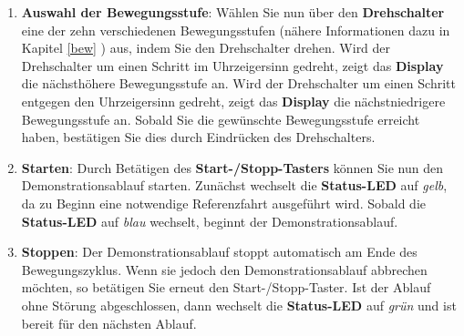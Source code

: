 \begin{enumerate}
\begin{center}
\end{center}


	
	\item \textbf{Auswahl der Bewegungsstufe}: Wählen Sie nun über den \textbf{Drehschalter} eine der zehn verschiedenen Bewegungsstufen (nähere Informationen dazu in Kapitel \ref{bew} ) aus, indem Sie den Drehschalter drehen. Wird der Drehschalter um einen Schritt im Uhrzeigersinn gedreht, zeigt das \textbf{Display} die nächsthöhere Bewegungsstufe an. Wird der Drehschalter um einen Schritt entgegen den Uhrzeigersinn gedreht, zeigt das \textbf{Display} die nächstniedrigere Bewegungsstufe an. Sobald Sie die gewünschte Bewegungsstufe erreicht haben, bestätigen Sie dies durch Eindrücken des Drehschalters.	
	
	\item \textbf{Starten}: Durch Betätigen des \textbf{Start-/Stopp-Tasters} können Sie nun den Demonstrationsablauf starten. Zunächst wechselt die \textbf{Status-LED} auf \textit{gelb}, da zu Beginn eine notwendige Referenzfahrt ausgeführt wird. Sobald die \textbf{Status-LED} auf \textit{blau} wechselt, beginnt der Demonstrationsablauf.
	
	\item \textbf{Stoppen}: Der Demonstrationsablauf stoppt automatisch am Ende des Bewegungszyklus. Wenn sie jedoch den Demonstrationsablauf abbrechen möchten, so betätigen Sie erneut den Start-/Stopp-Taster. Ist der Ablauf ohne Störung abgeschlossen, dann wechselt die \textbf{Status-LED} auf \textit{grün} und ist bereit für den nächsten Ablauf.
\end{enumerate}


